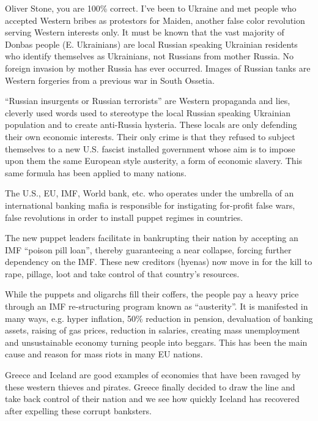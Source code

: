 \begin{itemize}

Oliver Stone, you are 100\% correct. I’ve been to Ukraine and met people who
accepted Western bribes as protestors for Maiden, another false color
revolution serving Western interests only. It must be known that the vast
majority of Donbas people (E. Ukrainians) are local Russian speaking Ukrainian
residents who identify themselves as Ukrainians, not Russians from mother
Russia. No foreign invasion by mother Russia has ever occurred. Images of
Russian tanks are Western forgeries from a previous war in South Ossetia.

\enquote{Russian insurgents or Russian terrorists} are Western propaganda and lies,
cleverly used words used to stereotype the local Russian speaking Ukrainian
population and to create anti-Russia hysteria. These locals are only defending
their own economic interests. Their only crime is that they refused to subject
themselves to a new U.S. fascist installed government whose aim is to impose
upon them the same European style austerity, a form of economic slavery. This
same formula has been applied to many nations. 

The U.S., EU, IMF, World bank,
etc. who operates under the umbrella of an international banking mafia is
responsible for instigating for-profit false wars, false revolutions in order
to install puppet regimes in countries. 

The new puppet leaders facilitate in bankrupting their nation by accepting an
IMF \enquote{poison pill loan}, thereby guaranteeing a near collapse, forcing
further dependency on the IMF. These new creditors (hyenas) now move in for the
kill to rape, pillage, loot and take control of that country’s resources. 

While the puppets and oligarchs fill their coffers, the people pay a heavy
price through an IMF re-structuring program known as \enquote{austerity}. It is
manifested in many ways, e.g. hyper inflation, 50\% reduction in pension,
devaluation of banking assets, raising of gas prices, reduction in salaries,
creating mass unemployment and unsustainable economy turning people into
beggars. This has been the main cause and reason for mass riots in many EU
nations. 

Greece and Iceland are good examples of economies that have been ravaged by
these western thieves and pirates. Greece finally decided to draw the line and
take back control of their nation and we see how quickly Iceland has recovered
after expelling these corrupt banksters.


\end{itemize}
